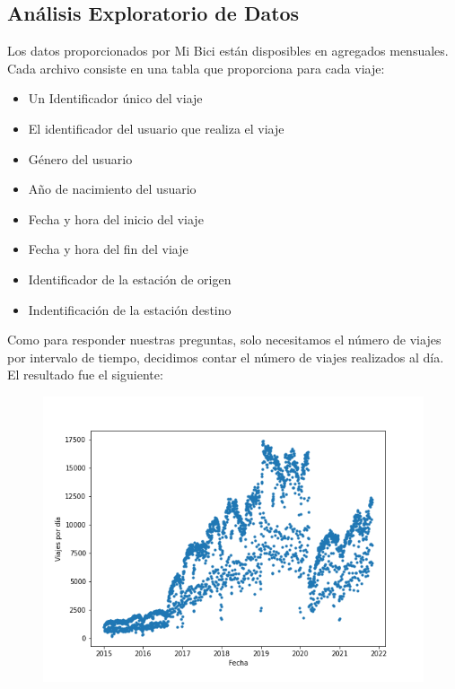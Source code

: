 \documentclass[
]{article}
\begin{document}
\hypertarget{anuxe1lisis-exploratorio-de-datos}{%
\subsection{Análisis Exploratorio de
Datos}\label{anuxe1lisis-exploratorio-de-datos}}

Los datos proporcionados por Mi Bici están disposibles en agregados
mensuales. Cada archivo consiste en una tabla que proporciona para cada
viaje:

\begin{itemize}
\item
  Un Identificador único del viaje
\item
  El identificador del usuario que realiza el viaje
\item
  Género del usuario
\item
  Año de nacimiento del usuario
\item
  Fecha y hora del inicio del viaje
\item
  Fecha y hora del fin del viaje
\item
  Identificador de la estación de origen
\item
  Indentificación de la estación destino
\end{itemize}

Como para responder nuestras preguntas, solo necesitamos el número de
viajes por intervalo de tiempo, decidimos contar el número de viajes
realizados al día. El resultado fue el siguiente:

\begin{figure}
\centering
\includegraphics{../plots/trips_daily.png}
\caption{}
\end{figure}
\end{document}
